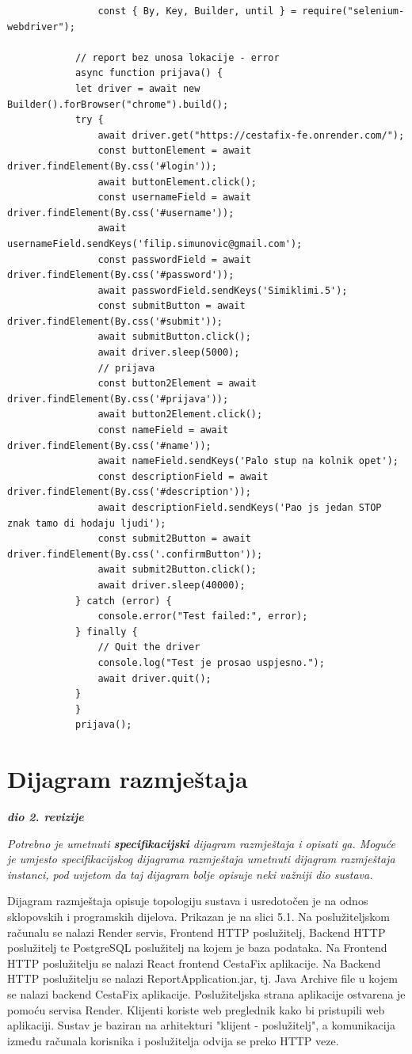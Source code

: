 			\begin{verbatim}
				const { By, Key, Builder, until } = require("selenium-webdriver");

			// report bez unosa lokacije - error
			async function prijava() {
			let driver = await new Builder().forBrowser("chrome").build();
			try {
				await driver.get("https://cestafix-fe.onrender.com/");
				const buttonElement = await driver.findElement(By.css('#login'));
				await buttonElement.click();
				const usernameField = await driver.findElement(By.css('#username'));
				await usernameField.sendKeys('filip.simunovic@gmail.com');
				const passwordField = await driver.findElement(By.css('#password'));
				await passwordField.sendKeys('Simiklimi.5');
				const submitButton = await driver.findElement(By.css('#submit'));
				await submitButton.click();
				await driver.sleep(5000);
				// prijava
				const button2Element = await driver.findElement(By.css('#prijava'));
				await button2Element.click();
				const nameField = await driver.findElement(By.css('#name'));
				await nameField.sendKeys('Palo stup na kolnik opet');
				const descriptionField = await driver.findElement(By.css('#description'));
				await descriptionField.sendKeys('Pao js jedan STOP znak tamo di hodaju ljudi');
				const submit2Button = await driver.findElement(By.css('.confirmButton'));
				await submit2Button.click();
				await driver.sleep(40000);
			} catch (error) {
				console.error("Test failed:", error);
			} finally {
				// Quit the driver
				console.log("Test je prosao uspjesno.");
				await driver.quit();
			}
			}
			prijava();
			\end{verbatim}

			
			\eject 
		
		\section{Dijagram razmještaja}
			
			\textbf{\textit{dio 2. revizije}}
			
			 \textit{Potrebno je umetnuti \textbf{specifikacijski} dijagram razmještaja i opisati ga. Moguće je umjesto specifikacijskog dijagrama razmještaja umetnuti dijagram razmještaja instanci, pod uvjetom da taj dijagram bolje opisuje neki važniji dio sustava.}
		
			Dijagram razmještaja opisuje topologiju sustava i usredotočen je na odnos sklopovskih i programskih
			dijelova. Prikazan je na slici 5.1. Na poslužiteljskom računalu se nalazi Render servis, Frontend HTTP poslužitelj, Backend HTTP 
			poslužitelj te PostgreSQL poslužitelj na kojem je baza podataka. Na Frontend HTTP poslužitelju se nalazi
			React frontend CestaFix aplikacije. Na Backend HTTP poslužitelju se nalazi ReportApplication.jar, tj. 
			Java Archive file u kojem se nalazi backend CestaFix aplikacije. Poslužiteljska strana aplikacije
			ostvarena je pomoću servisa Render. Klijenti koriste web preglednik kako bi pristupili web aplikaciji. 
			Sustav je baziran na arhitekturi "klijent - poslužitelj", a komunikacija između računala korisnika
			i poslužitelja odvija se preko HTTP veze.

